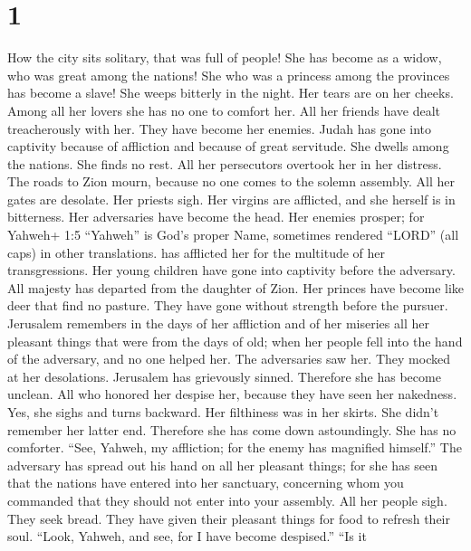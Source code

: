 \hypertarget{section}{%
\section{1}\label{section}}

 How the city sits solitary, that was full of people! She
has become as a widow, who was great among the nations! She who was a
princess among the provinces has become a slave!  She weeps
bitterly in the night. Her tears are on her cheeks. Among all her lovers
she has no one to comfort her. All her friends have dealt treacherously
with her. They have become her enemies.  Judah has gone into
captivity because of affliction and because of great servitude. She
dwells among the nations. She finds no rest. All her persecutors
overtook her in her distress.  The roads to Zion mourn,
because no one comes to the solemn assembly. All her gates are desolate.
Her priests sigh. Her virgins are afflicted, and she herself is in
bitterness.  Her adversaries have become the head. Her
enemies prosper; for Yahweh+ 1:5 ``Yahweh'' is God's proper Name,
sometimes rendered ``LORD'' (all caps) in other translations. has
afflicted her for the multitude of her transgressions. Her young
children have gone into captivity before the adversary.  All
majesty has departed from the daughter of Zion. Her princes have become
like deer that find no pasture. They have gone without strength before
the pursuer.  Jerusalem remembers in the days of her
affliction and of her miseries all her pleasant things that were from
the days of old; when her people fell into the hand of the adversary,
and no one helped her. The adversaries saw her. They mocked at her
desolations.  Jerusalem has grievously sinned. Therefore she
has become unclean. All who honored her despise her, because they have
seen her nakedness. Yes, she sighs and turns backward.  Her
filthiness was in her skirts. She didn't remember her latter end.
Therefore she has come down astoundingly. She has no comforter. ``See,
Yahweh, my affliction; for the enemy has magnified himself.''
 The adversary has spread out his hand on all her pleasant
things; for she has seen that the nations have entered into her
sanctuary, concerning whom you commanded that they should not enter into
your assembly.  All her people sigh. They seek bread. They
have given their pleasant things for food to refresh their soul. ``Look,
Yahweh, and see, for I have become despised.''  ``Is it
